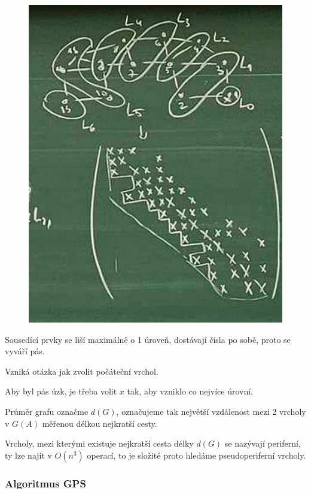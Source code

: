 \documentclass[../main.tex]{subfiles}
\begin{document}
\begin{example}
    \begin{figure}[H]
        \centering
        \includegraphics{images/26-10-CMK.png}
    \end{figure}
\end{example}

Sousedící prvky se liší maximálně o 1 úroveň, dostávají čísla po sobě, proto se vyváří pás.

Vzniká otázka jak zvolit počáteční vrchol.

Aby byl pás úzk, je třeba volit $x$ tak, aby vzniklo co nejvíce úrovní.

Průměr grafu označme $d(G)$, označujeme tak největší vzdálenost mezi 2 vrcholy v $G(A)$ měřenou délkou nejkratší cesty.

Vrcholy, mezi kterými existuje nejkratší cesta délky $d(G)$ se nazývají periferní, ty lze najít v $O(n^3)$ operací, to je složité proto hledáme pseudoperiferní vrcholy.

\subsubsection{Algoritmus GPS}
\end{document}
